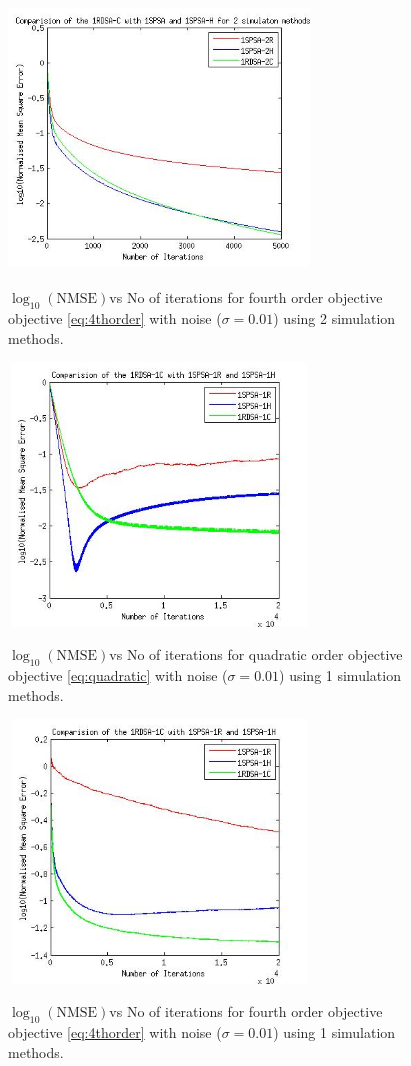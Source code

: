 \begin{figure}
\caption{$\log_{10}(\text{NMSE})$vs No of iterations for fourth order objective 
objective \eqref{eq:4thorder} with noise ($\sigma=0.01$) using 2 simulation methods.}
\includegraphics[width=8cm, height=7cm]{results_noise_fourthorder.jpg}\label{fig:noise_4thorder}
\end{figure}

\begin{figure}
\caption{$\log_{10}(\text{NMSE})$vs No of iterations for quadratic order objective 
objective \eqref{eq:quadratic} with noise ($\sigma=0.01$) using 1 simulation methods.}
\includegraphics[width=8cm, height=7cm]{results_noise_1sim_quad.jpg}\label{fig:noise_quad_1sim}
\end{figure}

\begin{figure}
\caption{$\log_{10}(\text{NMSE})$vs No of iterations for fourth order objective 
objective \eqref{eq:4thorder} with noise ($\sigma=0.01$) using 1 simulation methods.}
\includegraphics[width=8cm, height=7cm]{results_noise_1sim_fourthorder.jpg}\label{fig:noise_4thorder_1sim}
\end{figure}




